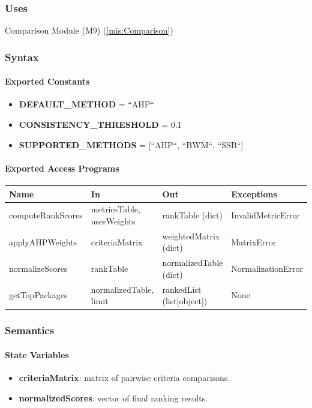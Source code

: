\documentclass[12pt, titlepage]{article}
\begin{document}
  \subsubsection{Uses}
  Comparison Module (M9) (\ref{mis:Comparison})\\

  \subsubsection{Syntax}

  \paragraph{Exported Constants}
  \begin{itemize}
    \item \textbf{DEFAULT\_METHOD} = ``AHP``
    \item \textbf{CONSISTENCY\_THRESHOLD} = 0.1
    \item \textbf{SUPPORTED\_METHODS} = [``AHP``, ``BWM``, ``SSB``]
  \end{itemize}

  \paragraph{Exported Access Programs}
  \begin{center}
  \renewcommand{\arraystretch}{1.2}
  \begin{tabularx}{\textwidth}{l X X l}
  \toprule
  \textbf{Name} & \textbf{In} & \textbf{Out} & \textbf{Exceptions}\\
  \midrule
  computeRankScores & metricsTable, userWeights & rankTable (dict) & InvalidMetricError \\
  applyAHPWeights & criteriaMatrix & weightedMatrix (dict) & MatrixError \\
  normalizeScores & rankTable & normalizedTable (dict) & NormalizationError \\
  getTopPackages & normalizedTable, limit & rankedList (list[object]) & None \\
  \bottomrule
  \end{tabularx}
  \end{center}

  \subsubsection{Semantics}

\paragraph{State Variables}
\begin{itemize}
  \item \textbf{criteriaMatrix}: matrix of pairwise criteria comparisons.
  \item \textbf{normalizedScores}: vector of final ranking results.
\end{itemize}
\end{document}
